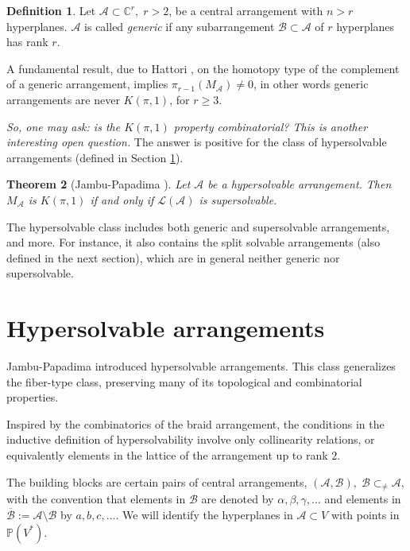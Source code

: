 \documentclass[psamsfonts]{conm-p-l}
\newtheorem{theorem}{Theorem}[section]
\theoremstyle{definition}
\newtheorem{definition}[theorem]{Definition}
\theoremstyle{remark}
\numberwithin{equation}{section}
\newcommand{\A}{{\mathcal A}}
\newcommand{\B}{{\mathcal B}}
\newcommand{\C}{\mathbb{C}}
\begin{document}
\begin{definition}
\label{counterexp}
Let $\A \subset \C^r, \;r>2$, be a central arrangement with $n>r$ hyperplanes. 
$\A$ is called {\em generic} if any subarrangement $\mathcal{B} \subset \A$ 
of $r$ hyperplanes has rank $r$. 
\end{definition}

 A fundamental result, due to Hattori \cite{Ha}, on the homotopy type of the complement of a generic 
 arrangement, implies $\pi_{r-1}(M_{\A}) \neq 0$, in other words generic arrangements 
 are never $K(\pi,1)$, for $r \geq 3$.
  
 {\it So, one may ask: is the $K(\pi,1)$ property combinatorial? This is another interesting
  open question.}
  The answer is positive for the class of hypersolvable arrangements
   (defined in Section \ref{sect:special}). 
   
\begin{theorem}[Jambu-Papadima \cite{JP1}]
\label{test}
Let $\A$ be a hypersolvable arrangement. Then $M_{\A}$ is $K(\pi,1)$ if 
and only if $\mathcal L(\A)$ is supersolvable.
\end{theorem}

 The hypersolvable class includes both generic and supersolvable arrangements, and more. 
 For instance, it also contains the
 split solvable arrangements (also defined in the next section), 
 which are in general neither generic nor supersolvable. 

\section{Hypersolvable arrangements}
\label{sect:special}

Jambu-Papadima \cite{JP1} introduced hypersolvable arrangements. This  class  generalizes  
the fiber-type class, preserving many of its topological and combinatorial properties.

Inspired by the combinatorics of the braid arrangement, the conditions in the inductive definition 
of hypersolvability involve only collinearity relations, or equivalently elements in the lattice 
of the arrangement up to rank $2$.

The building blocks are certain pairs of central arrangements,
$(\A, \B),\; \B \subset_{\neq} \A$, 
with the convention that elements in $\B$ are denoted by $\alpha, \beta, \gamma, \dots$ 
and elements in $\overline{\B}:=\A \setminus\B$ by $a, b, c, \dots$. We will identify the hyperplanes
in $\A \subset V$ with points in $\mathbb{P}(V^*)$.
\end{document}
